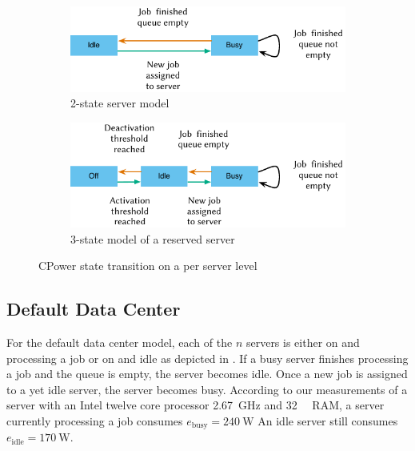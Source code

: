 \begin{figure}
	\begin{subfigure}[b]{\textwidth}
	\centering
	\includegraphics{cloud/data_centers/problem_formulation/figures/idle_busy}
	\caption{2-state server model}\label{fig:cloud:data_centers:problem_formulation:servers:idle_busy}
	\end{subfigure} 
	\begin{subfigure}[b]{\textwidth}
	\centering
	\includegraphics{cloud/data_centers/problem_formulation/figures/idle_busy_off}
	\caption{3-state model of a reserved server}\label{fig:cloud:data_centers:problem_formulation:idle_busy_off}
	\end{subfigure}

	\caption{CPower state transition on a per server level}\label{fig:sec:cloud:data_centers:problem_formulation:servers}
\end{figure}

\subsection{Default Data Center}\label{sec:cloud:data_centers:problem_formulation:default_data_center}
For the default data center model, each of the \(n\) servers is either on and processing a job or on and idle as depicted in .
If a busy server finishes processing a job and the queue is empty, the server becomes idle. Once a new job is assigned to a yet idle server, the server becomes busy.
According to our measurements of a server with an Intel twelve core processor \SI{2.67}{\giga\hertz} and \SI{32}{\giga\byte} RAM, a server currently processing a job consumes \(e_{\text{busy}} = \SI{240}{\watt}\)
An idle server still consumes \(e_{\text{idle}} = \SI{170}{\watt}\).

